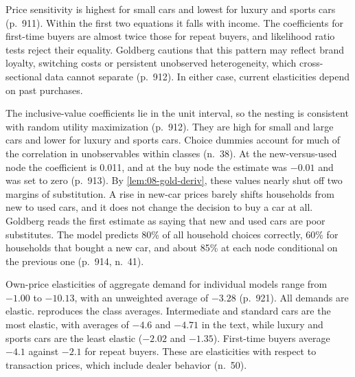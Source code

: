 Price sensitivity is highest for small cars and lowest for luxury and sports cars (p.~911). Within the first two
equations it falls with income. The coefficients for first-time buyers are almost twice those for repeat
buyers, and likelihood ratio tests reject their equality. Goldberg cautions that this pattern may reflect brand
loyalty, switching costs or persistent unobserved heterogeneity, which cross-sectional data cannot separate
(p.~912). In either case, current elasticities depend on past purchases.

The inclusive-value coefficients lie in the unit interval, so the nesting is consistent with random utility
maximization (p.~912). They are high for small and large cars and lower for luxury and sports cars. Choice
dummies account for much of the correlation in unobservables within classes (n.~38). At the new-versus-used node
the coefficient is 0.011, and at the buy node the estimate was $-0.01$ and was set to zero (p.~913). By
\cref{lem:08-gold-deriv}, these values nearly shut off two margins of substitution. A rise in new-car prices
barely shifts households from new to used cars, and it does not change the decision to buy a car at all.
Goldberg reads the first estimate as saying that new and used cars are poor substitutes. The model predicts 80\%
of all household choices correctly, 60\% for households that bought a new car, and about 85\% at each node
conditional on the previous one (p.~914, n.~41).

 Own-price elasticities of aggregate demand for individual models range from $-1.00$ to
$-10.13$, with an unweighted average of $-3.28$ (p.~921). All demands are elastic. 
reproduces the class averages. Intermediate and standard cars are the most elastic, with averages of $-4.6$ and
$-4.71$ in the text, while luxury and sports cars are the least elastic ($-2.02$ and $-1.35$). First-time buyers
average $-4.1$ against $-2.1$ for repeat buyers. These are elasticities with respect to transaction prices, which
include dealer behavior (n.~50).

